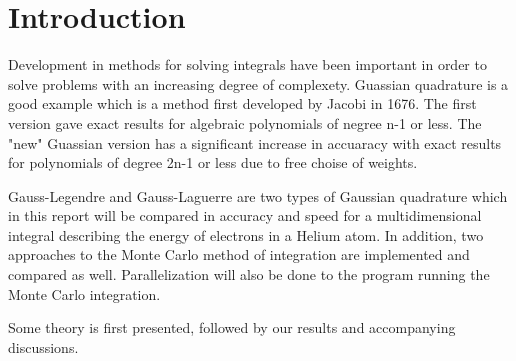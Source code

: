 \documentclass[../main.tex]{subfiles}
\begin{document}
\section{Introduction} \label{sec:intro}
Development in methods for solving integrals have been important in order to solve problems with an increasing degree of complexety. Guassian quadrature is a good example which is a method first developed by Jacobi in 1676. The first version gave exact results for algebraic polynomials of negree n-1 or less. The "new" Guassian version has a significant increase in accuaracy with exact results for polynomials of degree 2n-1 or less due to free choise of weights.

Gauss-Legendre and Gauss-Laguerre are two types of Gaussian quadrature which in this report will be compared in accuracy and speed for a multidimensional integral describing the energy of electrons in a Helium atom. In addition, two approaches to the Monte Carlo method of integration are implemented and compared as well. Parallelization will also be done to the program running the Monte Carlo integration.

Some theory is first presented, followed by our results and accompanying discussions.
\end{document}
